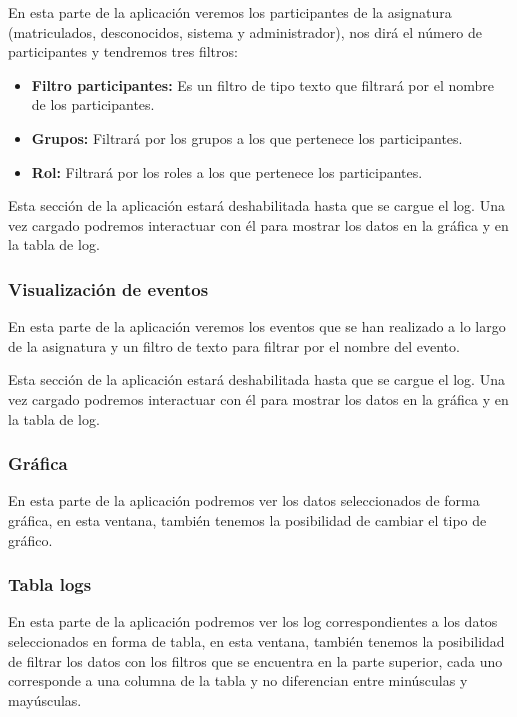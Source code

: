 En esta parte de la aplicación veremos los participantes de la asignatura (matriculados, desconocidos, sistema y administrador), nos dirá el número de participantes y tendremos tres filtros:


\begin{itemize}
	\tightlist
	\item
	\textbf{Filtro participantes:} Es un filtro de tipo texto que filtrará por el nombre de los participantes.
	\item
	\textbf{Grupos:} Filtrará por los grupos a los que pertenece los participantes.
	\item
	\textbf{Rol:} Filtrará por los roles a los que pertenece los participantes.
	
\end{itemize}



Esta sección de la aplicación estará deshabilitada hasta que se cargue el log. Una vez cargado podremos interactuar con él para mostrar los datos en la gráfica y en la tabla de log.
\newpage
\subsubsection{Visualización de eventos}

En esta parte de la aplicación veremos los eventos que se han realizado a lo largo de la asignatura y un filtro de texto para filtrar por el nombre del evento.



Esta sección de la aplicación estará deshabilitada hasta que se cargue el log. Una vez cargado podremos interactuar con él para mostrar los datos en la gráfica y en la tabla de log.

\subsubsection{Gráfica}

En esta parte de la aplicación podremos ver los datos seleccionados de forma gráfica, en esta ventana, también tenemos la posibilidad de cambiar el tipo de gráfico.

\newpage
\subsubsection{Tabla logs}

En esta parte de la aplicación podremos ver los log correspondientes a los datos seleccionados en forma de tabla, en esta ventana, también tenemos la posibilidad de filtrar los datos con los filtros que se encuentra en la parte superior, cada uno corresponde a una columna de la tabla y no diferencian entre minúsculas y mayúsculas.

